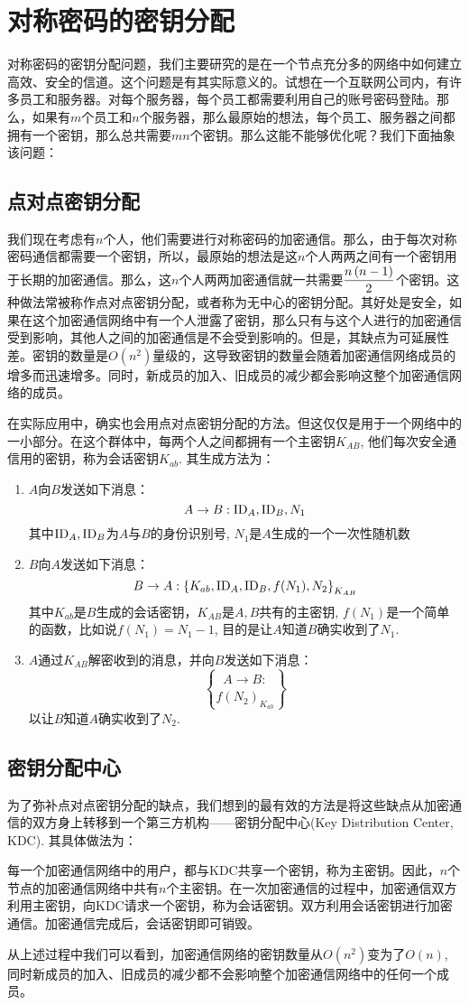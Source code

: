 \section{对称密码的密钥分配}
对称密码的密钥分配问题，我们主要研究的是在一个节点充分多的网络中如何建立高效、安全的信道。这个问题是有其实际意义的。试想在一个互联网公司内，有许多员工和服务器。对每个服务器，每个员工都需要利用自己的账号密码登陆。那么，如果有$m$个员工和$n$个服务器，那么最原始的想法，每个员工、服务器之间都拥有一个密钥，那么总共需要$mn$个密钥。那么这能不能够优化呢？我们下面抽象该问题：
\subsection{点对点密钥分配}
我们现在考虑有$n$个人，他们需要进行对称密码的加密通信。那么，由于每次对称密码通信都需要一个密钥，所以，最原始的想法是这$n$个人两两之间有一个密钥用于长期的加密通信。那么，这$n$个人两两加密通信就一共需要$\displaystyle\frac{n\left( {n-1}\right)}{2}$个密钥。这种做法常被称作点对点密钥分配，或者称为无中心的密钥分配。其好处是安全，如果在这个加密通信网络中有一个人泄露了密钥，那么只有与这个人进行的加密通信受到影响，其他人之间的加密通信是不会受到影响的。但是，其缺点为可延展性差。密钥的数量是$O(n^2)$量级的，这导致密钥的数量会随着加密通信网络成员的增多而迅速增多。同时，新成员的加入、旧成员的减少都会影响这整个加密通信网络的成员。\par
在实际应用中，确实也会用点对点密钥分配的方法。但这仅仅是用于一个网络中的一小部分。在这个群体中，每两个人之间都拥有一个主密钥$K_{AB}$, 他们每次安全通信用的密钥，称为会话密钥$K_{ab}$. 其生成方法为：
\begin{enumerate}
	\item $A$向$B$发送如下消息：
	\[A\to B: \mathrm{ID}_A, \mathrm{ID}_B, N_1\]
	其中$\mathrm{ID}_A, \mathrm{ID}_B$为$A$与$B$的身份识别号, $N_1$是$A$生成的一个一次性随机数
	\item $B$向$A$发送如下消息：
	\[B\to A: \left\{ {K_{ab}, \mathrm{ID}_A, \mathrm{ID}_B, f(N_1), N_2} \right\}_{K_{AB}}\]
	其中$K_{ab}$是$B$生成的会话密钥，$K_{AB}$是$A, B$共有的主密钥, $f(N_1)$是一个简单的函数，比如说$f(N_1)=N_1-1$, 目的是让$A$知道$B$确实收到了$N_1$.
	\item $A$通过$K_{AB}$解密收到的消息，并向$B$发送如下消息：
	\[A\to B:\brace{f(N_2)}_{K_{ab}}\]
	以让$B$知道$A$确实收到了$N_2$.
\end{enumerate}
\subsection{密钥分配中心}
为了弥补点对点密钥分配的缺点，我们想到的最有效的方法是将这些缺点从加密通信的双方身上转移到一个第三方机构——密钥分配中心(Key Distribution Center, KDC). 其具体做法为：\par
每一个加密通信网络中的用户，都与KDC共享一个密钥，称为主密钥。因此，$n$个节点的加密通信网络中共有$n$个主密钥。在一次加密通信的过程中，加密通信双方利用主密钥，向KDC请求一个密钥，称为会话密钥。双方利用会话密钥进行加密通信。加密通信完成后，会话密钥即可销毁。\par
从上述过程中我们可以看到，加密通信网络的密钥数量从$O(n^2)$变为了$O(n)$, 同时新成员的加入、旧成员的减少都不会影响整个加密通信网络中的任何一个成员。
